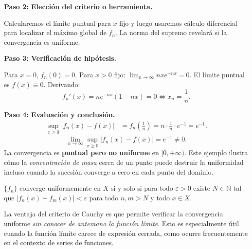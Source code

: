 \begin{example}
\begin{myproof}
\textbf{Paso 2: Elección del criterio o herramienta.}

Calcularemos el límite puntual para $x$ fijo y luego usaremos cálculo
diferencial para localizar el máximo global de $f_n$. La norma del
supremo revelará si la convergencia es uniforme.

\textbf{Paso 3: Verificación de hipótesis.}

Para $x=0$, $f_n(0)=0$. Para $x>0$ fijo:
$\lim_{n\to\infty} nxe^{-nx} = 0$.
El límite puntual es $f(x) \equiv 0$. Derivando:
\[
    f_n'(x) = ne^{-nx}(1 - nx) = 0 \iff x_n = \frac{1}{n}.
\]

\textbf{Paso 4: Evaluación y conclusión.}
\begin{align*}
    \sup_{x \geq 0} |f_n(x) - f(x)|
        &= f_n\!\left(\frac{1}{n}\right)
         = n\cdot\frac{1}{n}\cdot e^{-1} = e^{-1}.
\end{align*}
\[
    \boxed{\lim_{n \to \infty}
        \sup_{x \geq 0} |f_n(x) - f(x)| = e^{-1} \neq 0.}
\]
La convergencia es \textbf{puntual pero no uniforme} en $[0,+\infty)$.
Este ejemplo ilustra cómo la \emph{concentración de masa} cerca de un
punto puede destruir la uniformidad incluso cuando la sucesión converge
a cero en cada punto del dominio.
\end{myproof}
\end{example}

\begin{theorem}
$\{f_n\}$ converge uniformemente en $X$ si y solo si para todo
$\varepsilon > 0$ existe $N \in \mathbb{N}$ tal que
$|f_n(x) - f_m(x)| < \varepsilon$ para todo $n, m > N$ y todo
$x \in X$.
\end{theorem}

\begin{rem}
La ventaja del criterio de Cauchy es que permite verificar la
convergencia uniforme \emph{sin conocer de antemano la función límite}.
Esto es especialmente útil cuando la función límite carece de
expresión cerrada, como ocurre frecuentemente en el contexto de series
de funciones.
\end{rem}

